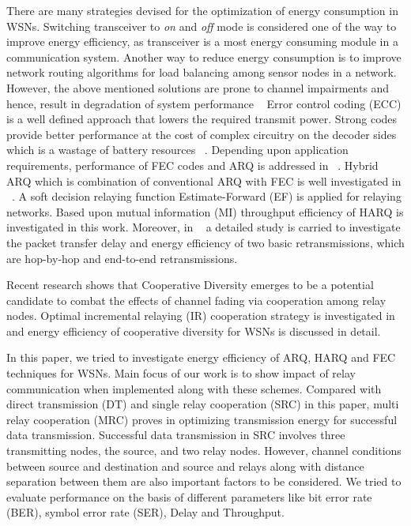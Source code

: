 \documentclass{sig-alternate}
\begin{document}
There are many strategies devised for the optimization of energy consumption in WSNs. Switching transceiver to \textit{on} and \textit{off} mode is considered one of the way to improve energy efficiency, as transceiver is a most energy consuming module in a communication system. Another way to reduce energy consumption is to improve network routing algorithms for load balancing among sensor nodes in a network. However, the above mentioned solutions are prone to channel impairments and hence, result in degradation of system performance ~\cite{2, 4, 13, 15} 
Error control coding (ECC) is a well defined approach that lowers the required transmit power. Strong codes provide better performance at the cost of complex circuitry on the decoder sides which is a wastage of battery resources ~\cite{1}. Depending upon application requirements, performance of FEC codes and ARQ is addressed in ~\cite{8}. Hybrid ARQ which is combination of conventional ARQ with FEC is well investigated in ~\cite{3,9}. A soft decision relaying function Estimate-Forward (EF) is applied for relaying networks. Based upon mutual information (MI) throughput efficiency of HARQ is investigated in this work. Moreover, in ~\cite{7} a detailed study is carried to investigate the packet transfer delay and energy efficiency of two basic retransmissions, which are hop-by-hop and end-to-end retransmissions.

Recent research shows that Cooperative Diversity emerges to be a potential candidate to combat the effects of channel fading via cooperation among relay nodes. Optimal incremental relaying (IR) cooperation strategy is investigated in ~\cite{6} and energy efficiency of cooperative diversity for WSNs is discussed in detail.

In this paper, we tried to investigate energy efficiency of ARQ, HARQ and FEC techniques for WSNs. Main focus of our work is to show impact of relay communication when implemented along with these schemes. Compared with direct transmission (DT) and single relay cooperation (SRC) in this paper, multi relay cooperation (MRC) proves in optimizing transmission energy for successful data transmission. Successful data transmission in SRC involves three transmitting nodes, the source, and two relay nodes. However, channel conditions between source and destination and source and relays along with distance separation between them are also important factors to be considered. We tried to evaluate performance on the basis of different parameters like bit error rate (BER), symbol error rate (SER), Delay and Throughput.
\end{document}
